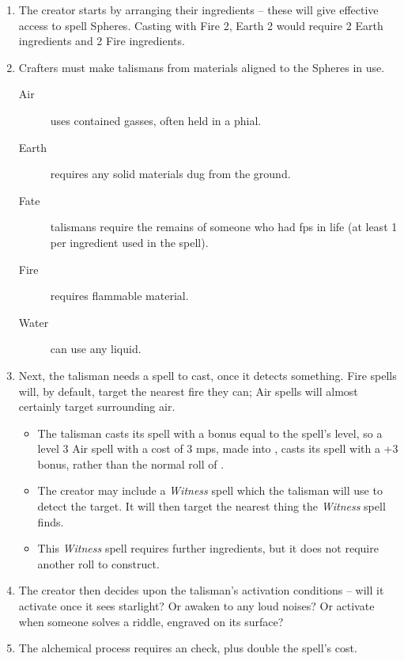\begin{multicols}{2}
\begin{enumerate}
  \item
  The creator starts by arranging their \glspl{ingredient} -- these will give effective access to spell Spheres.
  Casting with Fire 2, Earth 2 would require 2 Earth \glspl{ingredient} and 2 Fire \glspl{ingredient}.
  \item
  Crafters must make \glspl{talisman} from materials aligned to the Spheres in use.
  \begin{description}
    \item[Air]
    uses contained gasses, often held in a phial.
    \item[Earth]
    requires any solid materials dug from the ground.
    \item[Fate]
    talismans require the remains of someone who had \glspl{fp} in life (at least 1 per \gls{ingredient} used in the spell).
    \item[Fire]
    requires flammable material.
    \item[Water]
    can use any liquid.
  \end{description}
  \item
  Next, the \gls{talisman} needs a spell to cast, once it detects something.
  Fire spells will, by default, target the nearest fire they can; Air spells will almost certainly target surrounding air.
  \begin{itemize}
    \item
    The \gls{talisman} casts its spell with a bonus equal to the spell's level, so a level 3 Air spell with a cost of 3 \glspl{mp}, made into , casts its spell with a +3 bonus, rather than the normal roll of .
    \item
    The creator may include a \textit{Witness} spell which the \gls{talisman} will use to detect the target.
    It will then target the nearest thing the \textit{Witness} spell finds.
    \item
    This \textit{Witness} spell requires further \glspl{ingredient}, but it does not require another roll to construct.
  \end{itemize}
  \item
  The creator then decides upon the talisman's activation conditions -- will it activate once it sees starlight?
  Or awaken to any loud noises?
  Or activate when someone solves a riddle, engraved on its surface?
  \item
  The alchemical process requires an  check, \tn[10] plus double the spell's cost.
\end{enumerate}


\end{multicols}

